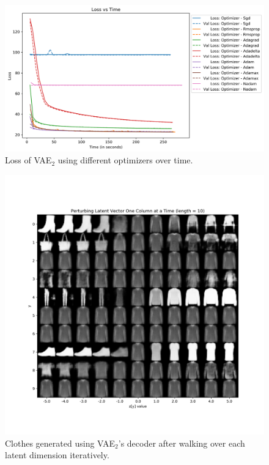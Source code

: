 \documentclass[12pt]{article}
\begin{document}
  \begin{figure}
    \centering
    \includegraphics[width=\linewidth]{task_5_loss_time_2.png}
    \caption{Loss of VAE$_2$ using different optimizers over time.}
    \label{fig:task_5_loss_time_2}
  \end{figure}

  \begin{figure}
    \centering
    \includegraphics[width=\linewidth]{task_5_clothes_kernel_5_kernels_32_latent_10.png}
    \caption{Clothes generated using VAE$_2$'s decoder after walking over each latent dimension iteratively.}
    \label{fig:task_5_clothes_kernel_5_kernels_32_latent_10}
  \end{figure}
\end{document}
